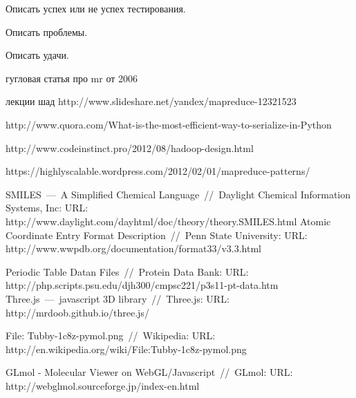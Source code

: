 \documentclass[12pt,a4paper,oneside]{extarticle}
\begin{document}
    Описать успех или не успех тестирования. 

    Описать проблемы. 

    Описать удачи.
    
\clearpage


\begin{thebibliography}{0}
    гугловая статья про mr от 2006

    лекции шад http://www.slideshare.net/yandex/mapreduce-12321523

    http://www.quora.com/What-is-the-most-efficient-way-to-serialize-in-Python

    http://www.codeinstinct.pro/2012/08/hadoop-design.html

    https://highlyscalable.wordpress.com/2012/02/01/mapreduce-patterns/

         SMILES~---~A Simplified Chemical Language~//~Daylight Chemical Information Systems, Inc: URL: http://www.daylight.com/dayhtml/doc/theory/theory.SMILES.html
        Atomic Coordinate Entry Format Description~//~Penn State University: URL: http://www.wwpdb.org/documentation/format33/v3.3.html
        
        Periodic Table Datan Files~//~Protein Data Bank: URL: http://php.scripts.psu.edu/djh300/cmpsc221/p3s11-pt-data.htm
        Three.js~---~javascript 3D library~//~Three.js: URL: http://mrdoob.github.io/three.js/
        
       File: Tubby-1c8z-pymol.png~//~Wikipedia: URL: http://en.wikipedia.org/wiki/File:Tubby-1c8z-pymol.png
             
       GLmol - Molecular Viewer on WebGL/Javascript~//~GLmol: URL: http://webglmol.sourceforge.jp/index-en.html
        
\end{thebibliography}
\end{document}
